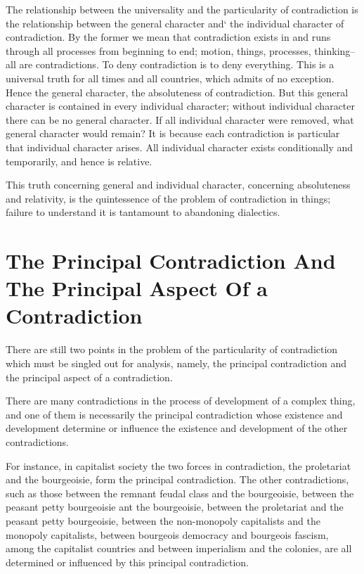 \documentclass{article}
\begin{document}
The relationship between the universality and the particularity of
contradiction is the relationship between the general character and` the
individual character of contradiction. By the former we mean that contradiction
exists in and runs through all processes from beginning to end; motion, things,
processes, thinking--all are contradictions. To deny contradiction is to deny
everything. This is a universal truth for all times and all countries, which
admits of no exception. Hence the general character, the absoluteness of
contradiction. But this general character is contained in every individual
character; without individual character there can be no general character. If
all individual character were removed, what general character would remain? It
is because each contradiction is particular that individual character arises.
All individual character exists conditionally and temporarily, and hence is
relative.

This truth concerning general and individual character, concerning absoluteness
and relativity, is the quintessence of the problem of contradiction in things;
failure to understand it is tantamount to abandoning dialectics.

\section{The Principal Contradiction And The Principal Aspect Of a Contradiction}

There are still two points in the problem of the particularity of contradiction
which must be singled out for analysis, namely, the principal contradiction and
the principal aspect of a contradiction.

There are many contradictions in the process of development of a complex thing,
and one of them is necessarily the principal contradiction whose existence and
development determine or influence the existence and development of the other
contradictions.

For instance, in capitalist society the two forces in contradiction, the
proletariat and the bourgeoisie, form the principal contradiction. The other
contradictions, such as those between the remnant feudal class and the
bourgeoisie, between the peasant petty bourgeoisie ant the bourgeoisie, between
the proletariat and the peasant petty bourgeoisie, between the non-monopoly
capitalists and the monopoly capitalists, between bourgeois democracy and
bourgeois fascism, among the capitalist countries and between imperialism and
the colonies, are all determined or influenced by this principal contradiction.
\end{document}
